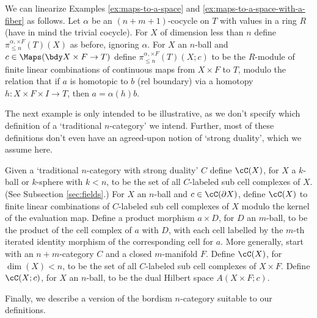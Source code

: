 \begin{example}
\rm
\label{ex:linearized-maps-to-a-space}%
We can linearize Examples \ref{ex:maps-to-a-space} and \ref{ex:maps-to-a-space-with-a-fiber} as follows.
Let $\alpha$ be an $(n{+}m{+}1)$-cocycle on $T$ with values in a ring $R$
(have in mind the trivial cocycle).
For $X$ of dimension less than $n$ define $\pi^{\alpha, \times F}_{\leq n}(T)(X)$ as before, ignoring $\alpha$.
For $X$ an $n$-ball and $c\in \Maps(\bdy X \times F \to T)$ define $\pi^{\alpha, \times F}_{\leq n}(T)(X; c)$ to be
the $R$-module of finite linear combinations of continuous maps from $X\times F$ to $T$,
modulo the relation that if $a$ is homotopic to $b$ (rel boundary) via a homotopy
$h: X\times F\times I \to T$, then $a = \alpha(h)b$.
\end{example}

The next example is only intended to be illustrative, as we don't specify which definition of a `traditional $n$-category' we intend. Further, most of these definitions don't even have an agreed-upon notion of `strong duality', which we assume here.
\begin{example}
\rm
\label{ex:traditional-n-categories}
Given a `traditional $n$-category with strong duality' $C$
define $\cC(X)$, for $X$ a $k$-ball or $k$-sphere with $k < n$,
to be the set of all $C$-labeled sub cell complexes of $X$.
(See Subsection \ref{sec:fields}.)
For $X$ an $n$-ball and $c\in \cC(\bd X)$, define $\cC(X)$ to finite linear
combinations of $C$-labeled sub cell complexes of $X$
modulo the kernel of the evaluation map.
Define a product morphism $a\times D$, for $D$ an $m$-ball, to be the product of the cell complex of $a$ with $D$,
with each cell labelled by the $m$-th iterated identity morphism of the corresponding cell for $a$.
More generally, start with an $n{+}m$-category $C$ and a closed $m$-manifold $F$.
Define $\cC(X)$, for $\dim(X) < n$,
to be the set of all $C$-labeled sub cell complexes of $X\times F$.
Define $\cC(X; c)$, for $X$ an $n$-ball,
to be the dual Hilbert space $A(X\times F; c)$.
\end{example}

Finally, we describe a version of the bordism $n$-category suitable to our definitions.


